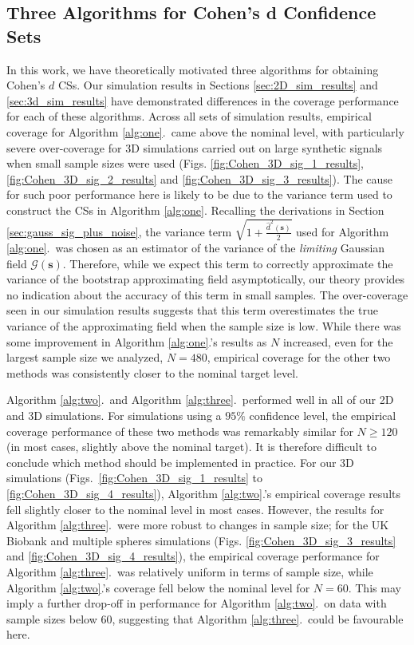 \subsection{Three Algorithms for Cohen's d Confidence Sets}
In this work, we have theoretically motivated three algorithms for obtaining Cohen's $d$ CSs. Our simulation results in Sections \ref{sec:2D_sim_results} and \ref{sec:3d_sim_results} have demonstrated differences in the coverage performance for each of these algorithms. Across all sets of simulation results, empirical coverage for Algorithm \ref{alg:one}.\ came above the nominal level, with particularly severe over-coverage for 3D simulations carried out on large synthetic signals when small sample sizes were used (Figs. \ref{fig:Cohen_3D_sig_1_results}, \ref{fig:Cohen_3D_sig_2_results} and \ref{fig:Cohen_3D_sig_3_results}). The cause for such poor performance here is likely to be due to the variance term used to construct the CSs in Algorithm \ref{alg:one}. Recalling the derivations in Section \ref{sec:gauss_sig_plus_noise}, the variance term $\sqrt{1 + \frac{\hat{d}^{2}(\bm{s})}{2}}$ used for Algorithm \ref{alg:one}.\ was chosen as an estimator of the variance of the \textit{limiting} Gaussian field $\mathcal{G}(\bm{s})$. Therefore, while we expect this term to correctly approximate the variance of the bootstrap approximating field asymptotically, our theory provides no indication about the accuracy of this term in small samples. The over-coverage seen in our simulation results suggests that this term overestimates the true variance of the approximating field when the sample size is low. While there was some improvement in Algorithm \ref{alg:one}.'s results as $N$ increased, even for the largest sample size we analyzed, $N = 480$, empirical coverage for the other two methods was consistently closer to the nominal target level. 

Algorithm \ref{alg:two}.\ and Algorithm \ref{alg:three}.\ performed well in all of our 2D and 3D simulations. For simulations using a $95\%$ confidence level, the empirical coverage performance of these two methods was remarkably similar for $N \geq 120$ (in most cases, slightly above the nominal target). It is therefore difficult to conclude which method should be implemented in practice. For our 3D simulations (Figs.\ \ref{fig:Cohen_3D_sig_1_results} to \ref{fig:Cohen_3D_sig_4_results}), Algorithm \ref{alg:two}.'s empirical coverage results fell slightly closer to the nominal level in most cases. However, the results for Algorithm \ref{alg:three}.\ were more robust to changes in sample size; for the UK Biobank and multiple spheres simulations (Figs. \ref{fig:Cohen_3D_sig_3_results} and \ref{fig:Cohen_3D_sig_4_results}), the empirical coverage performance for Algorithm \ref{alg:three}.\ was relatively uniform in terms of sample size, while Algorithm \ref{alg:two}.'s coverage fell below the nominal level for $N = 60$. This may imply a further drop-off in performance for Algorithm \ref{alg:two}.\ on data with sample sizes below 60, suggesting that Algorithm \ref{alg:three}.\ could be favourable here. 

